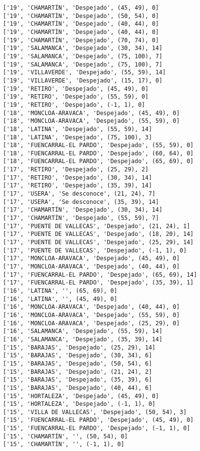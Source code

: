 \documentclass[11pt]{article}
\begin{document}
\begin{Verbatim}[commandchars=\\\{\}]
['19', 'CHAMARTÍN', 'Despejado', (45, 49), 0]
['19', 'CHAMARTÍN', 'Despejado', (50, 54), 0]
['19', 'CHAMARTÍN', 'Despejado', (40, 44), 0]
['19', 'CHAMARTÍN', 'Despejado', (40, 44), 0]
['19', 'CHAMARTÍN', 'Despejado', (70, 74), 0]
['19', 'SALAMANCA', 'Despejado', (30, 34), 14]
['19', 'SALAMANCA', 'Despejado', (75, 100), 7]
['19', 'SALAMANCA', 'Despejado', (75, 100), 7]
['19', 'VILLAVERDE', 'Despejado', (55, 59), 14]
['19', 'VILLAVERDE', 'Despejado', (15, 17), 0]
['19', 'RETIRO', 'Despejado', (45, 49), 0]
['19', 'RETIRO', 'Despejado', (55, 59), 0]
['19', 'RETIRO', 'Despejado', (-1, 1), 0]
['18', 'MONCLOA-ARAVACA', 'Despejado', (45, 49), 0]
['18', 'MONCLOA-ARAVACA', 'Despejado', (55, 59), 0]
['18', 'LATINA', 'Despejado', (55, 59), 14]
['18', 'LATINA', 'Despejado', (75, 100), 3]
['18', 'FUENCARRAL-EL PARDO', 'Despejado', (55, 59), 0]
['18', 'FUENCARRAL-EL PARDO', 'Despejado', (60, 64), 0]
['18', 'FUENCARRAL-EL PARDO', 'Despejado', (65, 69), 0]
['17', 'RETIRO', 'Despejado', (25, 29), 2]
['17', 'RETIRO', 'Despejado', (30, 34), 14]
['17', 'RETIRO', 'Despejado', (35, 39), 14]
['17', 'USERA', 'Se desconoce', (21, 24), 7]
['17', 'USERA', 'Se desconoce', (35, 39), 14]
['17', 'CHAMARTÍN', 'Despejado', (30, 34), 14]
['17', 'CHAMARTÍN', 'Despejado', (55, 59), 7]
['17', 'PUENTE DE VALLECAS', 'Despejado', (21, 24), 1]
['17', 'PUENTE DE VALLECAS', 'Despejado', (18, 20), 14]
['17', 'PUENTE DE VALLECAS', 'Despejado', (25, 29), 14]
['17', 'PUENTE DE VALLECAS', 'Despejado', (-1, 1), 0]
['17', 'MONCLOA-ARAVACA', 'Despejado', (45, 49), 0]
['17', 'MONCLOA-ARAVACA', 'Despejado', (40, 44), 0]
['17', 'FUENCARRAL-EL PARDO', 'Despejado', (65, 69), 14]
['17', 'FUENCARRAL-EL PARDO', 'Despejado', (35, 39), 1]
['16', 'LATINA', '', (65, 69), 0]
['16', 'LATINA', '', (45, 49), 0]
['16', 'MONCLOA-ARAVACA', 'Despejado', (40, 44), 0]
['16', 'MONCLOA-ARAVACA', 'Despejado', (55, 59), 0]
['16', 'MONCLOA-ARAVACA', 'Despejado', (25, 29), 0]
['16', 'SALAMANCA', 'Despejado', (55, 59), 14]
['16', 'SALAMANCA', 'Despejado', (35, 39), 14]
['15', 'BARAJAS', 'Despejado', (25, 29), 14]
['15', 'BARAJAS', 'Despejado', (30, 34), 6]
['15', 'BARAJAS', 'Despejado', (50, 54), 6]
['15', 'BARAJAS', 'Despejado', (21, 24), 2]
['15', 'BARAJAS', 'Despejado', (35, 39), 6]
['15', 'BARAJAS', 'Despejado', (40, 44), 6]
['15', 'HORTALEZA', 'Despejado', (45, 49), 0]
['15', 'HORTALEZA', 'Despejado', (-1, 1), 0]
['15', 'VILLA DE VALLECAS', 'Despejado', (50, 54), 3]
['15', 'FUENCARRAL-EL PARDO', 'Despejado', (45, 49), 0]
['15', 'FUENCARRAL-EL PARDO', 'Despejado', (-1, 1), 0]
['15', 'CHAMARTÍN', '', (50, 54), 0]
['15', 'CHAMARTÍN', '', (-1, 1), 0]

\end{Verbatim}
\end{document}
